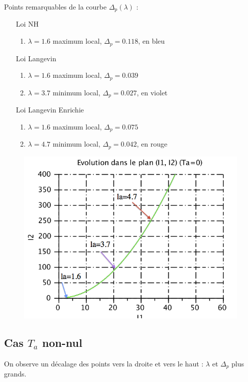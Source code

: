 \documentclass[a4paper,11pt]{article}
\begin{document}
Points remarquables de la courbe $\Delta_p(\lambda)$ : 
\begin{itemize}
	\item[Loi NH]
	\begin{enumerate}
	\item $\lambda = 1.6$ maximum local, $\Delta_p = 0.118$, en bleu
	\end{enumerate}
	\item[Loi Langevin]
	\begin{enumerate}
	\item $\lambda = 1.6$ maximum local, $\Delta_p = 0.039$
	\item $\lambda = 3.7$ minimum local, $\Delta_p = 0.027$, en violet
	\end{enumerate}
	\item[Loi Langevin Enrichie]
	\begin{enumerate}
	\item $\lambda = 1.6$ maximum local, $\Delta_p = 0.075$
	\item $\lambda = 4.7$ minimum local, $\Delta_p = 0.042$, en rouge
	\end{enumerate}
\end{itemize}
\begin{figure}[!h]
\centering\includegraphics[scale=1.2]{scilab/q533.png}
\end{figure}
\FloatBarrier



\subsection{Cas $T_a$ non-nul}
On observe un décalage des points vers la droite et vers le haut : $\lambda$ et $\Delta_p$ plus grands.
\end{document}
